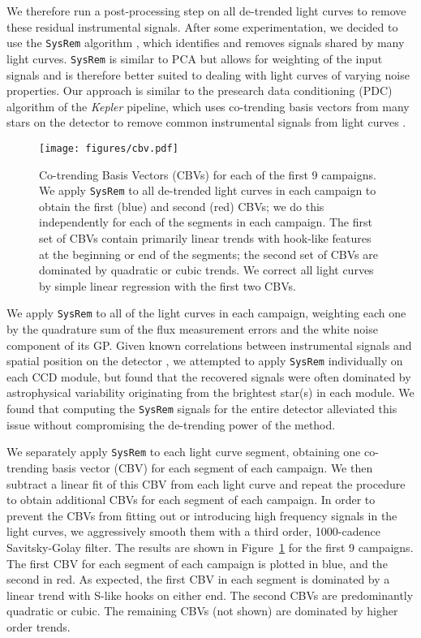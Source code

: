 \documentclass[]{emulateapj}
\newcommand{\edited}[1]{{\color{red} #1}}
\begin{document}
We therefore run a post-processing step on all de-trended light curves to remove these
residual instrumental signals. After some experimentation, we decided to use the
\texttt{SysRem} algorithm \citep{Tamuz05}, which identifies and removes signals shared by many
light curves. \texttt{SysRem} is similar to PCA but allows for weighting of the input
signals and is therefore better suited to dealing with light curves of varying noise
properties. Our approach is similar to the presearch data conditioning (PDC) algorithm
of the \emph{Kepler} pipeline, which uses co-trending basis vectors from many stars
on the detector to remove common instrumental signals from light curves \citep{Stumpe12,Smith12}.

\begin{figure}[hbt]
  \begin{center}
      \texttt{[image: figures/cbv.pdf]}
      \caption{Co-trending Basis Vectors (CBVs) for each of the first 9 campaigns.
         We apply \texttt{SysRem} to all de-trended light curves
         in each campaign to obtain the first (blue) and second (red) CBVs; we do this
         independently for each of the segments in each campaign.
         The first set of CBVs contain primarily linear trends with hook-like
         features at the beginning or end of the segments; the second set of CBVs are
         dominated by quadratic or cubic trends. We correct all
         light curves by simple
         linear regression with the first two CBVs.}
     \label{fig:cbv}
  \end{center}
\end{figure}

We apply \texttt{SysRem} to all of the light curves in each campaign, weighting each one
by the quadrature sum of the flux measurement errors and the white noise component of its
GP. Given known correlations between instrumental signals and spatial position on the
detector \citep[e.g.,][]{Petigura12,Wang16}, we attempted to apply \texttt{SysRem} individually
on each CCD module, but found that the recovered signals were often dominated by
astrophysical variability originating from the brightest star(s) in each module.
We found that computing the \texttt{SysRem} signals for the entire detector alleviated
this issue without compromising the de-trending power of the method.

We separately apply \texttt{SysRem} to each light curve segment, obtaining one
co-trending basis vector (CBV) for each segment of each campaign. We then subtract a linear
fit of this CBV from each light curve and repeat the procedure to obtain additional CBVs
for each segment of each campaign. In order to prevent the CBVs from fitting out or
introducing high frequency signals in the light curves, we aggressively smooth them
with a third order, 1000-cadence Savitsky-Golay filter. The results are shown in
Figure~\ref{fig:cbv} \edited{for the first 9 campaigns}. The first CBV for each segment of each campaign is plotted in blue,
and the second in red. As expected, the first CBV in each segment is dominated by a linear trend with S-like
hooks on either end. The second CBVs are predominantly quadratic or cubic. The remaining
CBVs (not shown) are dominated by higher order trends.
\end{document}
